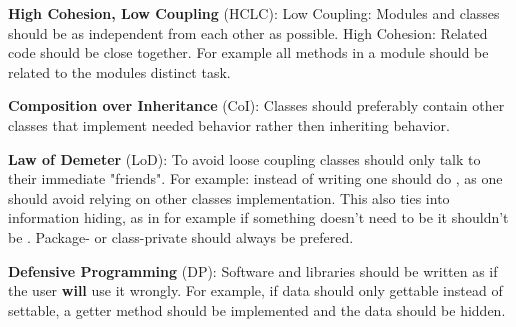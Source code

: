 \documentclass{article}
\begin{document}
\begin{enumerate}
          \textbf{High Cohesion, Low Coupling} (HCLC):\newline
          Low Coupling: Modules and classes should be as independent from each other as possible.
          \newline
          High Cohesion: Related code should be close together. For example all methods
          in a module should be related to the modules distinct task.

          \textbf{Composition over Inheritance} (CoI):\newline
          Classes should preferably contain other classes that implement needed behavior rather
          then inheriting behavior.

          \textbf{Law of Demeter} (LoD):\newline
          To avoid loose coupling classes should only talk to their immediate "friends".\newline
          For example: instead of writing  one should do ,
          as one should avoid relying on other classes implementation. This also ties into
          information hiding, as in for example if something doesn't need to be  it shouldn't
          be . Package- or class-private should always be prefered.

          \textbf{Defensive Programming} (DP):\newline
          Software and libraries should be written as if the user \textbf{will} use it wrongly.
          For example, if data should only gettable instead of settable, a getter method
          should be implemented and the data should be hidden.
\end{enumerate}
\newpage
\end{document}
